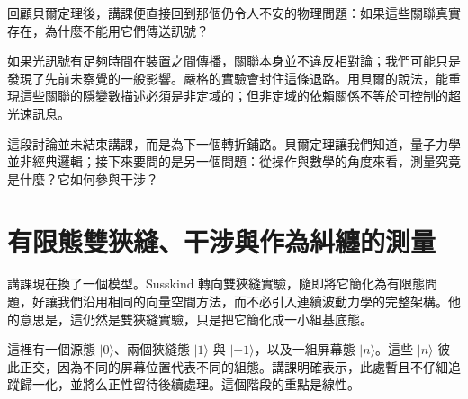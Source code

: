 \begin{classroomqa}
\end{classroomqa}

回顧貝爾定理後，講課便直接回到那個仍令人不安的物理問題：如果這些關聯真實存在，為什麼不能用它們傳送訊號？

\begin{classroomqa}
\end{classroomqa}

如果光訊號有足夠時間在裝置之間傳播，關聯本身並不違反相對論；我們可能只是發現了先前未察覺的一般影響。嚴格的實驗會封住這條退路。用貝爾的說法，能重現這些關聯的隱變數描述必須是非定域的；但非定域的依賴關係不等於可控制的超光速訊息。

\begin{classroomqa}
\end{classroomqa}

這段討論並未結束講課，而是為下一個轉折鋪路。貝爾定理讓我們知道，量子力學並非經典邏輯；接下來要問的是另一個問題：從操作與數學的角度來看，測量究竟是什麼？它如何參與干涉？

\section{有限態雙狹縫、干涉與作為糾纏的測量}

講課現在換了一個模型。Susskind 轉向雙狹縫實驗，隨即將它簡化為有限態問題，好讓我們沿用相同的向量空間方法，而不必引入連續波動力學的完整架構。他的意思是，這仍然是雙狹縫實驗，只是把它簡化成一小組基底態。

這裡有一個源態 \(|0\rangle\)、兩個狹縫態 \(|1\rangle\) 與 \(|-1\rangle\)，以及一組屏幕態 \(|n\rangle\)。這些 \(|n\rangle\) 彼此正交，因為不同的屏幕位置代表不同的組態。講課明確表示，此處暫且不仔細追蹤歸一化，並將么正性留待後續處理。這個階段的重點是線性。


